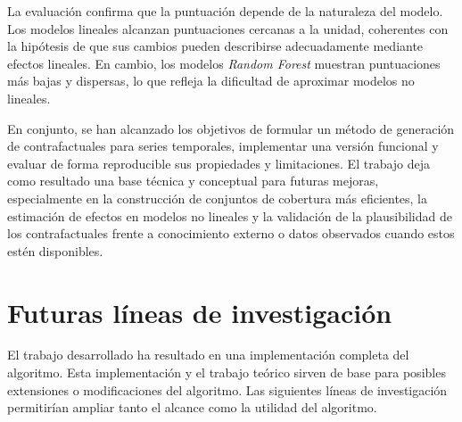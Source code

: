 \documentclass[12pt]{report} %
\begin{document}
La evaluación confirma que la puntuación depende de la naturaleza del modelo. Los modelos lineales alcanzan puntuaciones cercanas a la unidad, coherentes con la hipótesis de que sus cambios pueden describirse adecuadamente mediante efectos lineales. En cambio, los modelos \textit{Random Forest} muestran puntuaciones más bajas y dispersas, lo que refleja la dificultad de aproximar modelos no lineales.

En conjunto, se han alcanzado los objetivos de formular un método de generación de contrafactuales para series temporales, implementar una versión funcional y evaluar de forma reproducible sus propiedades y limitaciones. El trabajo deja como resultado una base técnica y conceptual para futuras mejoras, especialmente en la construcción de conjuntos de cobertura más eficientes, la estimación de efectos en modelos no lineales y la validación de la plausibilidad de los contrafactuales frente a conocimiento externo o datos observados cuando estos estén disponibles.

\chapter{Futuras líneas de investigación}
\label{cap:futuras_lineas}

El trabajo desarrollado ha resultado en una implementación completa del algoritmo. Esta implementación y el trabajo teórico sirven de base para posibles extensiones o modificaciones del algoritmo. Las siguientes líneas de investigación permitirían ampliar tanto el alcance como la utilidad del algoritmo.
\end{document}
